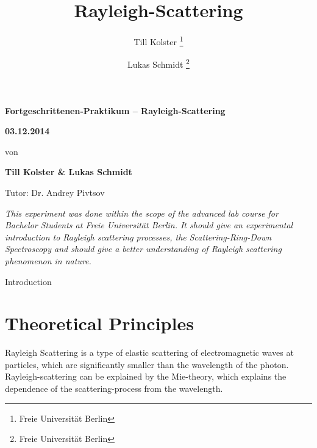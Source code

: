 \documentclass[
	parskip=half,10pt,
	numbers= noenddot, %
	toc=flat, %
	oneside,
	twocolumn,
	]{scrartcl}
\title {Rayleigh-Scattering}
\author {Till Kolster \thanks{Freie Universität Berlin} \and Lukas Schmidt \thanks{Freie Universität Berlin}}
\begin{document}
\begin{titlepage}

\vspace*{-2cm}

\vspace{6cm}
\begin{center}
\huge \bfseries
Fortgeschrittenen-Praktikum -- Rayleigh-Scattering

\vspace{0.5cm}
\large \bfseries
03.12.2014

\vspace{1.5cm}

\large\normalfont von

\bigskip
\textbf{Till Kolster \& Lukas Schmidt}

\bigskip
Tutor: Dr. Andrey Pivtsov

\vspace{3cm}

\parbox{0.8\linewidth}{%
\textit{This experiment was done within the scope of the advanced lab course for Bachelor Students at Freie Universität Berlin.
It should give an experimental introduction to Rayleigh scattering processes, the Scattering-Ring-Down Spectroscopy and should
give a better understanding of Rayleigh scattering phenomenon in nature.
}}


\end{center}
\end{titlepage}

Introduction
\section{Theoretical Principles}

Rayleigh Scattering is a type of elastic scattering of electromagnetic waves at particles, which are significantly smaller than the wavelength of the photon. 
Rayleigh-scattering can be explained by the Mie-theory, which explains the dependence of the scattering-process from the wavelength. 
\end{document}
